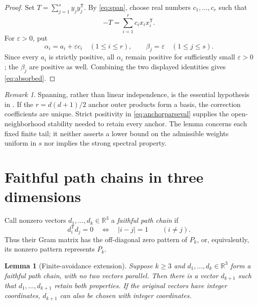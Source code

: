 \documentclass[11pt]{article}
\newtheorem{lemma}[theorem]{Lemma}
\theoremstyle{remark}
\newtheorem{remark}[theorem]{Remark}
\newcommand{\R}{\mathbb{R}}
\begin{document}
\begin{proof}
Set $T=\sum_{j=1}^s y_jy_j^{\mathsf T}$.  By \eqref{eq:span}, choose real
numbers $c_1,\ldots,c_r$ such that
\[
              -T=\sum_{i=1}^r c_i x_i x_i^{\mathsf T}.
\]
For $\varepsilon>0$, put
\[
 \alpha_i=a_i+\varepsilon c_i \quad(1\le i\le r),
 \qquad
 \beta_j=\varepsilon \quad(1\le j\le s).
\]
Since every $a_i$ is strictly positive, all $\alpha_i$ remain positive for
sufficiently small $\varepsilon>0$; the $\beta_j$ are positive as well.
Combining the two displayed identities gives \eqref{eq:absorbed}.
\end{proof}

\begin{remark}\label{rem:absorption}
Spanning, rather than linear independence, is the essential hypothesis in
.  If the $r=d(d+1)/2$ anchor outer products form a
basis, the correction coefficients are unique.  Strict positivity in
\eqref{eq:anchorparseval} supplies the open-neighborhood stability needed to
retain every anchor.  The lemma concerns each fixed finite tail; it neither
asserts a lower bound on the admissible weights uniform in $s$ nor implies
the strong spectral property.
\end{remark}

\section{Faithful path chains in three dimensions}

Call nonzero vectors $d_1,\ldots,d_k\in\R^3$ a \emph{faithful path chain}
if
\[
 d_i^{\mathsf T}d_j=0
 \quad\Longleftrightarrow\quad
 |i-j|=1
 \qquad(i\ne j).
 \tag{3.1}\label{eq:pathchain}
\]
Thus their Gram matrix has the off-diagonal zero pattern of $P_k$, or,
equivalently, its nonzero pattern represents $\overline{P_k}$.

\begin{lemma}[Finite-avoidance extension]\label{lem:extension}
Suppose $k\ge3$ and $d_1,\ldots,d_k\in\R^3$ form a faithful path chain, with
no two vectors parallel.  Then there is a vector $d_{k+1}$ such that
$d_1,\ldots,d_{k+1}$ retain both properties.  If the original vectors have
integer coordinates, $d_{k+1}$ can also be chosen with integer coordinates.
\end{lemma}
\end{document}
